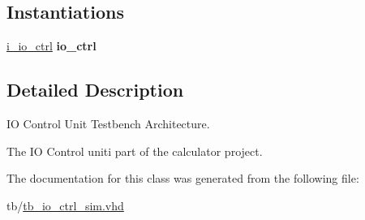 \subsection*{Instantiations}
 \begin{DoxyCompactItemize}
\item 
\mbox{\label{classtb__io__ctrl_1_1sim_a27c0b00ffb215dedd3c56546e08ebc31}} 
\hyperlink{classtb__io__ctrl_1_1sim_a27c0b00ffb215dedd3c56546e08ebc31}{i\+\_\+io\+\_\+ctrl}  {\bfseries io\+\_\+ctrl}   
\end{DoxyCompactItemize}


\subsection{Detailed Description}
IO Control Unit Testbench Architecture. 

The IO Control uniti part of the calculator project. 

The documentation for this class was generated from the following file\+:\begin{DoxyCompactItemize}
\item 
tb/\hyperlink{tb__io__ctrl__sim_8vhd}{tb\+\_\+io\+\_\+ctrl\+\_\+sim.\+vhd}\end{DoxyCompactItemize}
